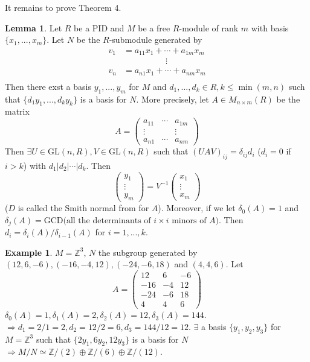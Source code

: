 \documentclass{article}
\theoremstyle{definition}
\newtheorem{ex}{Example}
\newtheorem{lem}{Lemma}
\newcommand{\ZZ}{\mathbb Z}
\newcommand{\Ra}{\Rightarrow}
\begin{document}
It remains to prove Theorem 4.

\begin{lem}
	Let $R$ be a PID and $M$ be a free $R$-module of rank $m$ with basis $\{x_1, ..., x_m\}$.
	Let $N$ be the $R$-submodule generated by
	\[
		\begin{split}
			v_1 &= a_{11} x_1 + \cdots + a_{1m} x_m\\
			&\quad \quad \quad \quad \quad \vdots\\
			v_n &= a_{n 1} x_1 + \cdots + a_{nm} x_m\\
		\end{split}
	\]
	Then there exst a basis $y_1, ..., y_m$ for $M$ and $d_1, ..., d_k \in R, k \leq \min(m, n)$ such that $\{d_1 y_1, ..., d_k y_k\}$ is a basis for $N$.
	More precisely, let $A \in M_{n \times m} (R)$ be the matrix 
	\[
		A = 
		\begin{pmatrix}
			a_{11} & \cdots &a_{1m}\\
			\vdots & & \vdots\\
			a_{n1} & \cdots & a_{nm}
		\end{pmatrix}
	\]
	Then $\exists U \in \text{GL}(n, R), V \in \text{GL}(n, R)$ such that $(UAV)_{ij} = \delta_{ij} d_i$ ($d_i = 0$ if $i > k$) with $d_1 | d_2 | \cdots | d_k$.
	Then 
	\[
		\begin{pmatrix}
			y_1\\
			\vdots\\
			y_m
		\end{pmatrix}
		=
		V^{-1}
		\begin{pmatrix}
			x_1\\
			\vdots\\
			x_m
		\end{pmatrix}
	\]
	($D$ is called the Smith normal from for $A$).
	Moreover, if we let $\delta_0(A) = 1$ and $\delta_j(A) = \text{GCD(all the determinants of } i \times i \text{ minors of }A)$.
	Then $d_i = \delta_i(A)/\delta_{i - 1}(A)$ for $i = 1, ..., k$.
\end{lem}

\begin{ex}
	$M = \ZZ^3$, $N$ the subgroup generated by $(12, 6, -6), (-16, -4, 12), (-24, -6, 18)$ and $(4, 4, 6)$.
	Let
	\[
		A = 
		\begin{pmatrix}
			12 & 6 & -6\\
			-16 & -4 & 12\\
			-24 & -6 & 18\\
			4 & 4 & 6
		\end{pmatrix}
	\]
	$\delta_0(A) = 1, \delta_1(A) = 2, \delta_2(A) = 12, \delta_3(A) = 144$.
	$\Ra d_1 = 2/1 = 2, d_2 = 12/2 = 6, d_3 = 144/12 = 12$.
	$\exists$ a basis $\{y_1, y_2, y_3\}$ for $M = \ZZ^3$ such that $\{2 y_1, 6 y_2, 12 y_3\}$ is a basis for $N$
	$\Ra M/N \simeq \ZZ/(2) \oplus \ZZ/(6) \oplus \ZZ/(12)$.
\end{ex}
\end{document}
